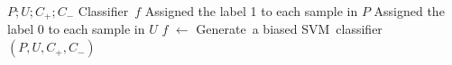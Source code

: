 \documentclass{article}
\begin{document}
\begin{algorithm}[!h]
\renewcommand{\algorithmicrequire}{\textbf{Input:}} %
\renewcommand{\algorithmicensure}{\textbf{Output:}} %
	\caption{Biased-SVM} %
	\begin{algorithmic}[1] %
	    \REQUIRE
	    $P;U;C_+;C_-$
	    \ENSURE
	    Classifier\ $f$
		\STATE Assigned the label 1 to each sample in $P$
		\STATE Assigned the label 0 to each sample in $U$
		\STATE $f$ $\leftarrow$ Generate\ a biased SVM\ classifier$(P,U,C_+,C_-)$
	\end{algorithmic}
\end{algorithm}
\end{document}
